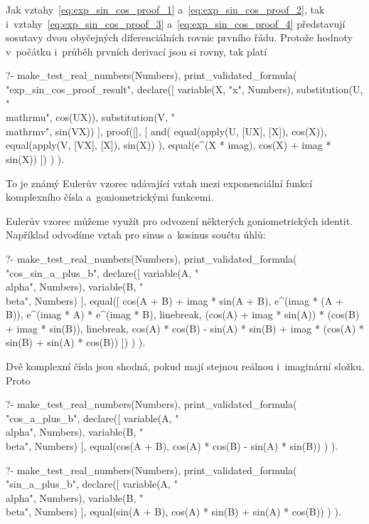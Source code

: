 Jak vztahy~\eqref{eq:exp_sin_cos_proof_1} a~\eqref{eq:exp_sin_cos_proof_2}, tak i~vztahy~\eqref{eq:exp_sin_cos_proof_3} a~\eqref{eq:exp_sin_cos_proof_4} představují sosutavy dvou obyčejných diferenciálních rovnic prvního řádu.
Protože hodnoty v~počátku i~průběh prvních derivací jsou si rovny, tak platí

\begin{prolog}
?-	make_test_real_numbers(Numbers),
	print_validated_formula(
		"exp_sin_cos_proof_result",
		declare([
			variable(X, "x", Numbers),
			substitution(U, "\\mathrm{u}", cos(UX)),
			substitution(V, "\\mathrm{v}", sin(VX)) 
		],
			proof([],
			[
				and(
					equal(apply(U, [UX], [X]), cos(X)),
					equal(apply(V, [VX], [X]), sin(X))
				),
				equal(e^(X * imag), cos(X) + imag * sin(X))
			])
		)
	).
\end{prolog}

To je známý Eulerův vzorec udávající vztah mezi exponenciální funkcí komplexního čísla a~goniometrickými funkcemi.

Eulerův vzorec můžeme využít pro odvození některých goniometrických identit. Například odvodíme vztah pro sinus a~kosinus součtu úhlů:

\begin{prolog}
?-	make_test_real_numbers(Numbers),
	print_validated_formula(
		"cos_sin_a_plus_b",
		declare([
			variable(A, "\\alpha", Numbers),
			variable(B, "\\beta", Numbers)
		],
			equal([
				cos(A + B) + imag * sin(A + B),
				e^(imag * (A + B)),
				e^(imag * A) * e^(imag * B),
				linebreak,
				(cos(A) + imag * sin(A)) * (cos(B) + imag * sin(B)),
				linebreak,
				cos(A) * cos(B) - sin(A) * sin(B) + imag * (cos(A) * sin(B) + sin(A) * cos(B))
			])
		)
	).
\end{prolog}

Dvě komplexní čísla jsou shodná, pokud mají stejnou reálnou i~imaginární složku. Proto

\begin{prolog}
?-	make_test_real_numbers(Numbers),
	print_validated_formula(
		"cos_a_plus_b",
		declare([
			variable(A, "\\alpha", Numbers),
			variable(B, "\\beta", Numbers)
		],
			equal(cos(A + B), cos(A) * cos(B) - sin(A) * sin(B))
		)
	).
\end{prolog}
\begin{prolog}
?-	make_test_real_numbers(Numbers),
	print_validated_formula(
		"sin_a_plus_b",
		declare([
			variable(A, "\\alpha", Numbers),
			variable(B, "\\beta", Numbers)
		],
			equal(sin(A + B), cos(A) * sin(B) + sin(A) * cos(B))
		)
	).
\end{prolog}

